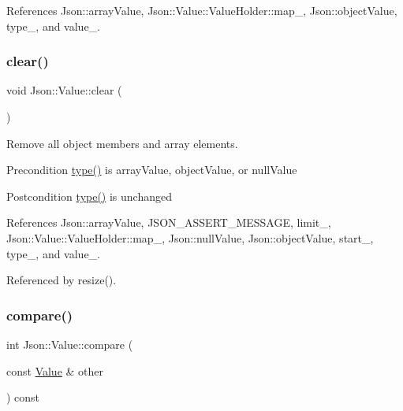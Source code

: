 References Json\+::array\+Value, Json\+::\+Value\+::\+Value\+Holder\+::map\+\_\+, Json\+::object\+Value, type\+\_\+, and value\+\_\+.

\mbox{\label{classJson_1_1Value_a501a4d67e6c875255c2ecc03ccd2019b_a501a4d67e6c875255c2ecc03ccd2019b}} 
\subsubsection{\texorpdfstring{clear()}{clear()}}
{\footnotesize\ttfamily void Json\+::\+Value\+::clear (\begin{DoxyParamCaption}{ }\end{DoxyParamCaption})}

Remove all object members and array elements. \begin{DoxyPrecond}{Precondition}
\hyperlink{classJson_1_1Value_a8ce61157a011894f0252ceed232312de_a8ce61157a011894f0252ceed232312de}{type()} is array\+Value, object\+Value, or null\+Value 
\end{DoxyPrecond}
\begin{DoxyPostcond}{Postcondition}
\hyperlink{classJson_1_1Value_a8ce61157a011894f0252ceed232312de_a8ce61157a011894f0252ceed232312de}{type()} is unchanged 
\end{DoxyPostcond}


References Json\+::array\+Value, J\+S\+O\+N\+\_\+\+A\+S\+S\+E\+R\+T\+\_\+\+M\+E\+S\+S\+A\+GE, limit\+\_\+, Json\+::\+Value\+::\+Value\+Holder\+::map\+\_\+, Json\+::null\+Value, Json\+::object\+Value, start\+\_\+, type\+\_\+, and value\+\_\+.



Referenced by resize().

\mbox{\label{classJson_1_1Value_aefa4464ca1bb0bcc9a87b38ed62ca2e0_aefa4464ca1bb0bcc9a87b38ed62ca2e0}} 
\subsubsection{\texorpdfstring{compare()}{compare()}}
{\footnotesize\ttfamily int Json\+::\+Value\+::compare (\begin{DoxyParamCaption}\item[{const \hyperlink{classJson_1_1Value}{Value} \&}]{other }\end{DoxyParamCaption}) const}

